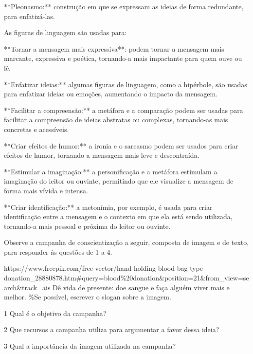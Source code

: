 {**Pleonasmo:** construção em que se expressam as ideias de forma redundante, para enfatizá-las.

As figuras de linguagem são usadas para:

**Tornar a mensagem mais expressiva**: podem tornar a mensagem mais
marcante, expressiva e poética, tornando-a mais impactante para quem
ouve ou lê.

**Enfatizar ideias:** algumas figuras de linguagem, como a hipérbole,
são usadas para enfatizar ideias ou emoções, aumentando o impacto da
mensagem.

**Facilitar a compreensão:** a metáfora e a comparação podem ser usadas
para facilitar a compreensão de ideias abstratas ou complexas,
tornando-as mais concretas e acessíveis.

**Criar efeitos de humor:** a ironia e o sarcasmo podem ser usados para
criar efeitos de humor, tornando a mensagem mais leve e descontraída.

**Estimular a imaginação:** a personificação e a metáfora estimulam a
imaginação do leitor ou ouvinte, permitindo que ele visualize a mensagem
de forma mais vívida e intensa.

**Criar identificação:** a metonímia, por exemplo, é usada para criar
identificação entre a mensagem e o contexto em que ela está sendo
utilizada, tornando-a mais pessoal e próxima do leitor ou ouvinte.}

Observe a campanha de conscientização a seguir, composta de imagem e de
texto, para responder às questões de 1 a 4.

https://www.freepik.com/free-vector/hand-holding-blood-bag-type-donation\_28880878.htm\#query=blood\%20donation\&position=21\&from\_view=search\&track=ais
Dê vida de presente: doe sangue e faça alguém viver mais e melhor. \%Se
possível, escrever o slogan sobre a imagem.

\num{1} Qual é o objetivo da campanha?



\num{2} Que recursos a campanha utiliza para argumentar a favor dessa
ideia?



\num{3} Qual a importância da imagem utilizada na campanha?



